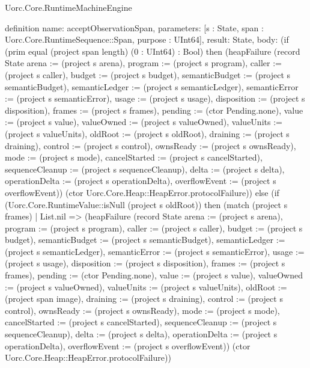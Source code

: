 \begin{lexlean}{Uorc.Core.RuntimeMachineEngine}
\begin{semanticmodule}
definition{
  name: acceptObservationSpan,
  parameters: [s : State, span : Uorc.Core.RuntimeSequence::Span, purpose : UInt64],
  result: State,
  body: (if (prim equal (project span length) (0 : UInt64) : Bool) then (heapFailure (record State {arena := (project s arena), program := (project s program), caller := (project s caller), budget := (project s budget), semanticBudget := (project s semanticBudget), semanticLedger := (project s semanticLedger), semanticError := (project s semanticError), usage := (project s usage), disposition := (project s disposition), frames := (project s frames), pending := (ctor Pending.none), value := (project s value), valueOwned := (project s valueOwned), valueUnits := (project s valueUnits), oldRoot := (project s oldRoot), draining := (project s draining), control := (project s control), ownsReady := (project s ownsReady), mode := (project s mode), cancelStarted := (project s cancelStarted), sequenceCleanup := (project s sequenceCleanup), delta := (project s delta), operationDelta := (project s operationDelta), overflowEvent := (project s overflowEvent)}) (ctor Uorc.Core.Heap::HeapError.protocolFailure)) else (if (Uorc.Core.RuntimeValue::isNull (project s oldRoot)) then (match (project s frames)
    | List.nil => (heapFailure (record State {arena := (project s arena), program := (project s program), caller := (project s caller), budget := (project s budget), semanticBudget := (project s semanticBudget), semanticLedger := (project s semanticLedger), semanticError := (project s semanticError), usage := (project s usage), disposition := (project s disposition), frames := (project s frames), pending := (ctor Pending.none), value := (project s value), valueOwned := (project s valueOwned), valueUnits := (project s valueUnits), oldRoot := (project span image), draining := (project s draining), control := (project s control), ownsReady := (project s ownsReady), mode := (project s mode), cancelStarted := (project s cancelStarted), sequenceCleanup := (project s sequenceCleanup), delta := (project s delta), operationDelta := (project s operationDelta), overflowEvent := (project s overflowEvent)}) (ctor Uorc.Core.Heap::HeapError.protocolFailure))
}
\end{semanticmodule}
\end{lexlean}
